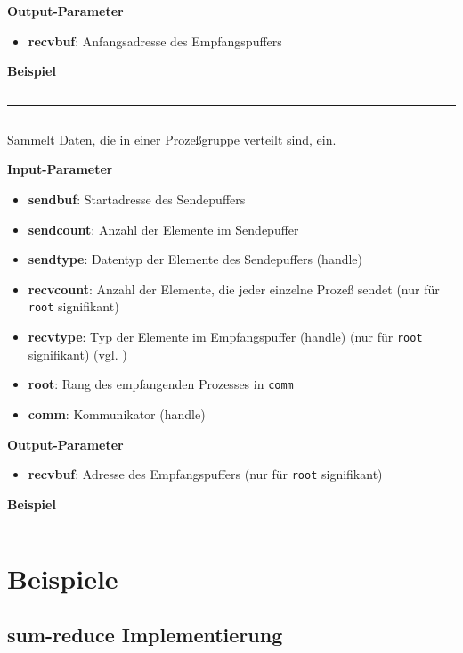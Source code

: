 \textbf{Output-Parameter}
\begin{itemize}
    \item \textbf{recvbuf}: Anfangsadresse des Empfangspuffers
\end{itemize}

\textbf{Beispiel}
\inputminted[numbersep=5pt, tabsize=4]{c}{scripts/mpi/mpi-allgather-example.c}
\goodbreak
\rule{\textwidth}{0.4pt}%
\inputminted[numbersep=5pt, tabsize=4]{c}{scripts/mpi/mpi-gather.c}
Sammelt Daten, die in einer Prozeßgruppe verteilt sind, ein.

\textbf{Input-Parameter}
\begin{itemize}
    \item \textbf{sendbuf}: Startadresse des Sendepuffers
    \item \textbf{sendcount}: Anzahl der Elemente im Sendepuffer
    \item \textbf{sendtype}: Datentyp der Elemente des Sendepuffers (handle)
    \item \textbf{recvcount}: Anzahl der Elemente, die jeder einzelne Prozeß sendet (nur für \texttt{root} signifikant) 
    \item \textbf{recvtype}: Typ der Elemente im Empfangspuffer (handle) (nur für \texttt{root} signifikant) (vgl. )
    \item \textbf{root}: Rang des empfangenden Prozesses in \texttt{comm}
    \item \textbf{comm}: Kommunikator (handle)
\end{itemize}

\textbf{Output-Parameter}
\begin{itemize}
    \item \textbf{recvbuf}: Adresse des Empfangspuffers (nur für \texttt{root} signifikant)
\end{itemize}

\textbf{Beispiel}
\inputminted[numbersep=5pt, tabsize=4]{c}{scripts/mpi/mpi-reduce-example.c}

\section{Beispiele}
\subsection{sum-reduce Implementierung}%
\inputminted[numbersep=5pt, tabsize=4]{c}{scripts/mpi/mpi-sum-reduce.c}

